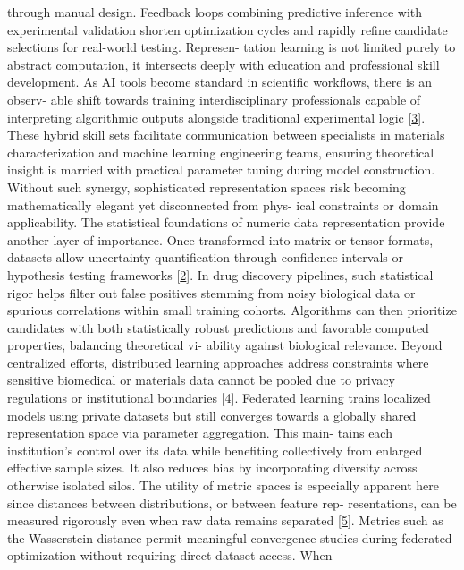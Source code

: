 \documentclass[
]{article}
\begin{document}
through manual design. Feedback loops combining predictive inference
with experimental validation shorten optimization cycles and rapidly
refine candidate selections for real-world testing. Represen- tation
learning is not limited purely to abstract computation, it intersects
deeply with education and professional skill development. As AI tools
become standard in scientific workflows, there is an observ- able shift
towards training interdisciplinary professionals capable of interpreting
algorithmic outputs alongside traditional experimental logic
{[}\protect\hyperlink{_bookmark43}{3}{]}. These hybrid skill sets
facilitate communication between specialists in materials
characterization and machine learning engineering teams, ensuring
theoretical insight is married with practical parameter tuning during
model construction. Without such synergy, sophisticated representation
spaces risk becoming mathematically elegant yet disconnected from phys-
ical constraints or domain applicability. The statistical foundations of
numeric data representation provide another layer of importance. Once
transformed into matrix or tensor formats, datasets allow uncertainty
quantification through confidence intervals or hypothesis testing
frameworks {[}\protect\hyperlink{_bookmark42}{2}{]}. In drug discovery
pipelines, such statistical rigor helps filter out false positives
stemming from noisy biological data or spurious correlations within
small training cohorts. Algorithms can then prioritize candidates with
both statistically robust predictions and favorable computed properties,
balancing theoretical vi- ability against biological relevance. Beyond
centralized efforts, distributed learning approaches address constraints
where sensitive biomedical or materials data cannot be pooled due to
privacy regulations or institutional boundaries
{[}\protect\hyperlink{_bookmark44}{4}{]}. Federated learning trains
localized models using private datasets but still converges towards a
globally shared representation space via parameter aggregation. This
main- tains each institution's control over its data while benefiting
collectively from enlarged effective sample sizes. It also reduces bias
by incorporating diversity across otherwise isolated silos. The utility
of metric spaces is especially apparent here since distances between
distributions, or between feature rep- resentations, can be measured
rigorously even when raw data remains separated
{[}\protect\hyperlink{_bookmark45}{5}{]}. Metrics such as the
Wasserstein distance permit meaningful convergence studies during
federated optimization without requiring direct dataset access. When
\end{document}
